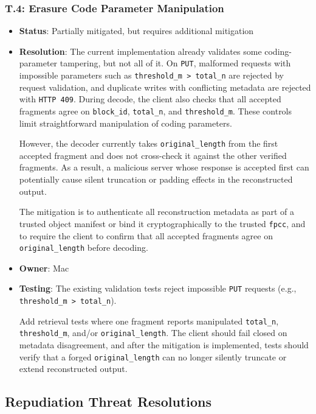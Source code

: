 \documentclass[../veristore_security_model.tex]{subfiles}
\begin{document}
\subsubsection{T.4: Erasure Code Parameter Manipulation}
\begin{itemize}
    \item \textbf{Status}: Partially mitigated, but requires additional mitigation
    \item \textbf{Resolution}: The current implementation already validates some coding-parameter tampering, but not all of it. On \texttt{PUT}, malformed requests with impossible parameters such as \texttt{threshold\_m > total\_n} are rejected by request validation, and duplicate writes with conflicting metadata are rejected with \texttt{HTTP 409}. During decode, the client also checks that all accepted fragments agree on \texttt{block\_id}, \texttt{total\_n}, and \texttt{threshold\_m}. These controls limit straightforward manipulation of coding parameters. 
    
    However, the decoder currently takes \texttt{original\_length} from the first accepted fragment and does not cross-check it against the other verified fragments. As a result, a malicious server whose response is accepted first can potentially cause silent truncation or padding effects in the reconstructed output. 
    
    The mitigation is to authenticate all reconstruction metadata as part of a trusted object manifest or bind it cryptographically to the trusted \texttt{fpcc}, and to require the client to confirm that all accepted fragments agree on \texttt{original\_length} before decoding.
    \item \textbf{Owner}: Mac
    \item \textbf{Testing}: The existing validation tests reject impossible \texttt{PUT} requests (e.g., \texttt{threshold\_m > total\_n}). 
    
    Add retrieval tests where one fragment reports manipulated \texttt{total\_n}, \texttt{threshold\_m}, and/or \newline \texttt{original\_length}. The client should fail closed on metadata disagreement, and after the mitigation is implemented, tests should verify that a forged \texttt{original\_length} can no longer silently truncate or extend reconstructed output.
\end{itemize}

\subsection{Repudiation Threat Resolutions}
\end{document}
